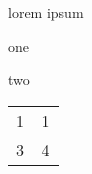 


\label{0}



lorem ipsum

\begin{myitemize}
\item{}one
\item{}two

\end{myitemize}
 


\begin{longtable}{>{\RaggedRight}p{0.47143\linewidth}>{\RaggedRight}p{0.47143\linewidth}} 
\hspace*{0pt}\ignorespaces{}1&\hspace*{0pt}\ignorespaces{}1
\\ 
\hspace*{0pt}\ignorespaces{}3&\hspace*{0pt}\ignorespaces{}4
 
\end{longtable}





